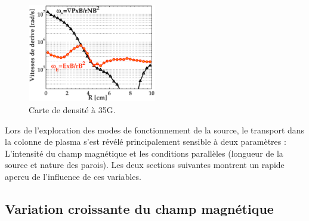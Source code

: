 \begin{refsection}
\begin{figure}[htbp]
\centering
\includegraphics[width=0.5\textwidth]{figures/4-CybeleProfileVitessesDerive.eps}
{\caption{Carte de densité à 35G.}
\label{4-CybeleVitessesDerive}}
\end{figure}

Lors de l'exploration des modes de fonctionnement de la source, le transport
dans la colonne de plasma s'est révélé principalement sensible à deux
paramètres : L'intensité du champ magnétique et les conditions parallèles 
(longueur de la source et nature des parois). Les deux sections suivantes
montrent un rapide apercu de l'influence de ces variables.

\subsection{Variation croissante du champ magnétique}


\end{refsection}
